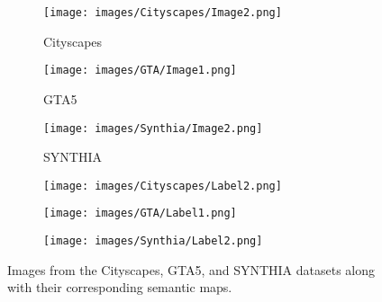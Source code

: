 \documentclass[10pt,twocolumn,letterpaper]{article}
\begin{document}
\begin{figure}[t]
    \centering
    \begin{adjustbox}{width=\columnwidth}
    \begin{subfigure}[b]{1.2\textwidth}
\caption*{\centering \fontsize{50}{30}\selectfont Cityscapes}
        \texttt{[image: images/Cityscapes/Image2.png]}
    \end{subfigure}
    \hspace{0.01cm}
    \begin{subfigure}[b]{1.2\textwidth}
\caption*{\centering \fontsize{50}{30}\selectfont GTA5}
        \texttt{[image: images/GTA/Image1.png]}
    \end{subfigure}
    \hspace{0.01cm}
    \begin{subfigure}[b]{1.2\textwidth}
\caption*{\centering \fontsize{50}{30}\selectfont SYNTHIA}
        \texttt{[image: images/Synthia/Image2.png]}
    \end{subfigure}
    \end{adjustbox}
    \begin{adjustbox}{width=\columnwidth}
    \begin{subfigure}[b]{1.5\textwidth}
        \texttt{[image: images/Cityscapes/Label2.png]}
    \end{subfigure}
    \hspace{0.01cm}
    \begin{subfigure}[b]{1.5\textwidth}
        \texttt{[image: images/GTA/Label1.png]}
    \end{subfigure}
    \hspace{0.01cm}
    \begin{subfigure}[b]{1.5\textwidth}
        \texttt{[image: images/Synthia/Label2.png]}
    \end{subfigure}
    \end{adjustbox}
    
    \caption{Images from the Cityscapes, GTA5, and SYNTHIA datasets along with their corresponding semantic maps.}
    \label{fig:exampleimages}
\end{figure}
\end{document}
